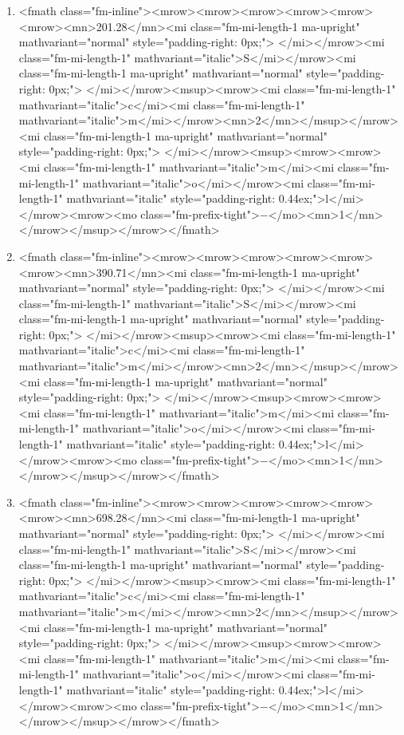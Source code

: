 \documentclass{article}
\begin{document}
\begin{enumerate}[label=(\alph*)]
\item  <fmath class="fm-inline"><mrow><mrow><mrow><mrow><mrow><mrow><mn>201.28</mn><mi class="fm-mi-length-1 ma-upright" mathvariant="normal" style="padding-right: 0px;"> </mi></mrow><mi class="fm-mi-length-1" mathvariant="italic">S</mi></mrow><mi class="fm-mi-length-1 ma-upright" mathvariant="normal" style="padding-right: 0px;"> </mi></mrow><msup><mrow><mi class="fm-mi-length-1" mathvariant="italic">c</mi><mi class="fm-mi-length-1" mathvariant="italic">m</mi></mrow><mn>2</mn></msup></mrow><mi class="fm-mi-length-1 ma-upright" mathvariant="normal" style="padding-right: 0px;"> </mi></mrow><msup><mrow><mrow><mi class="fm-mi-length-1" mathvariant="italic">m</mi><mi class="fm-mi-length-1" mathvariant="italic">o</mi></mrow><mi class="fm-mi-length-1" mathvariant="italic" style="padding-right: 0.44ex;">l</mi></mrow><mrow><mo class="fm-prefix-tight">−</mo><mn>1</mn></mrow></msup></mrow></fmath>
\item  <fmath class="fm-inline"><mrow><mrow><mrow><mrow><mrow><mrow><mn>390.71</mn><mi class="fm-mi-length-1 ma-upright" mathvariant="normal" style="padding-right: 0px;"> </mi></mrow><mi class="fm-mi-length-1" mathvariant="italic">S</mi></mrow><mi class="fm-mi-length-1 ma-upright" mathvariant="normal" style="padding-right: 0px;"> </mi></mrow><msup><mrow><mi class="fm-mi-length-1" mathvariant="italic">c</mi><mi class="fm-mi-length-1" mathvariant="italic">m</mi></mrow><mn>2</mn></msup></mrow><mi class="fm-mi-length-1 ma-upright" mathvariant="normal" style="padding-right: 0px;"> </mi></mrow><msup><mrow><mrow><mi class="fm-mi-length-1" mathvariant="italic">m</mi><mi class="fm-mi-length-1" mathvariant="italic">o</mi></mrow><mi class="fm-mi-length-1" mathvariant="italic" style="padding-right: 0.44ex;">l</mi></mrow><mrow><mo class="fm-prefix-tight">−</mo><mn>1</mn></mrow></msup></mrow></fmath>
\item  <fmath class="fm-inline"><mrow><mrow><mrow><mrow><mrow><mrow><mn>698.28</mn><mi class="fm-mi-length-1 ma-upright" mathvariant="normal" style="padding-right: 0px;"> </mi></mrow><mi class="fm-mi-length-1" mathvariant="italic">S</mi></mrow><mi class="fm-mi-length-1 ma-upright" mathvariant="normal" style="padding-right: 0px;"> </mi></mrow><msup><mrow><mi class="fm-mi-length-1" mathvariant="italic">c</mi><mi class="fm-mi-length-1" mathvariant="italic">m</mi></mrow><mn>2</mn></msup></mrow><mi class="fm-mi-length-1 ma-upright" mathvariant="normal" style="padding-right: 0px;"> </mi></mrow><msup><mrow><mrow><mi class="fm-mi-length-1" mathvariant="italic">m</mi><mi class="fm-mi-length-1" mathvariant="italic">o</mi></mrow><mi class="fm-mi-length-1" mathvariant="italic" style="padding-right: 0.44ex;">l</mi></mrow><mrow><mo class="fm-prefix-tight">−</mo><mn>1</mn></mrow></msup></mrow></fmath>

\end{enumerate}
\end{document}

